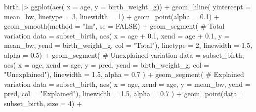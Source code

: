 \documentclass[
  letterpaper,
  DIV=11,
  numbers=noendperiod]{scrreprt}
\newenvironment{Shaded}{\begin{snugshade}}{\end{snugshade}}
\newcommand{\AttributeTok}[1]{\textcolor[rgb]{0.40,0.45,0.13}{#1}}
\newcommand{\CommentTok}[1]{\textcolor[rgb]{0.37,0.37,0.37}{#1}}
\newcommand{\ConstantTok}[1]{\textcolor[rgb]{0.56,0.35,0.01}{#1}}
\newcommand{\DecValTok}[1]{\textcolor[rgb]{0.68,0.00,0.00}{#1}}
\newcommand{\FloatTok}[1]{\textcolor[rgb]{0.68,0.00,0.00}{#1}}
\newcommand{\FunctionTok}[1]{\textcolor[rgb]{0.28,0.35,0.67}{#1}}
\newcommand{\NormalTok}[1]{\textcolor[rgb]{0.00,0.23,0.31}{#1}}
\newcommand{\SpecialCharTok}[1]{\textcolor[rgb]{0.37,0.37,0.37}{#1}}
\newcommand{\StringTok}[1]{\textcolor[rgb]{0.13,0.47,0.30}{#1}}
\begin{document}
\begin{Shaded}
\begin{Highlighting}[]
\NormalTok{birth }\SpecialCharTok{|\textgreater{}} 
  \FunctionTok{ggplot}\NormalTok{(}\FunctionTok{aes}\NormalTok{(}
    \AttributeTok{x =}\NormalTok{ age, }
    \AttributeTok{y =}\NormalTok{ birth\_weight\_g)) }\SpecialCharTok{+} 
  \FunctionTok{geom\_hline}\NormalTok{(}
    \AttributeTok{yintercept =}\NormalTok{ mean\_bw,}
    \AttributeTok{linetype =} \DecValTok{3}\NormalTok{,}
    \AttributeTok{linewidth =} \DecValTok{1}\NormalTok{) }\SpecialCharTok{+}
  \FunctionTok{geom\_point}\NormalTok{(}\AttributeTok{alpha =} \FloatTok{0.1}\NormalTok{) }\SpecialCharTok{+} 
  \FunctionTok{geom\_smooth}\NormalTok{(}\AttributeTok{method =} \StringTok{"lm"}\NormalTok{, }\AttributeTok{se =} \ConstantTok{FALSE}\NormalTok{) }\SpecialCharTok{+}
  \FunctionTok{geom\_segment}\NormalTok{( }\CommentTok{\# Total variation}
    \AttributeTok{data =}\NormalTok{ subset\_birth,}
    \FunctionTok{aes}\NormalTok{(}
      \AttributeTok{x =}\NormalTok{ age }\SpecialCharTok{+} \FloatTok{0.1}\NormalTok{,}
      \AttributeTok{xend =}\NormalTok{ age }\SpecialCharTok{+} \FloatTok{0.1}\NormalTok{,}
      \AttributeTok{y =}\NormalTok{  mean\_bw,}
      \AttributeTok{yend =}\NormalTok{ birth\_weight\_g,}
      \AttributeTok{col =} \StringTok{"Total"}\NormalTok{),}
    \AttributeTok{linetype =} \DecValTok{2}\NormalTok{,}
    \AttributeTok{linewidth =} \FloatTok{1.5}\NormalTok{,}
    \AttributeTok{alpha =} \FloatTok{0.5}\NormalTok{) }\SpecialCharTok{+}
    \FunctionTok{geom\_segment}\NormalTok{( }\CommentTok{\# Unexplained variation}
    \AttributeTok{data =}\NormalTok{ subset\_birth,}
    \FunctionTok{aes}\NormalTok{(}
      \AttributeTok{x =}\NormalTok{ age,}
      \AttributeTok{xend =}\NormalTok{ age,}
      \AttributeTok{y =}\NormalTok{  pred,}
      \AttributeTok{yend =}\NormalTok{ birth\_weight\_g,}
      \AttributeTok{col =} \StringTok{"Unexplained"}\NormalTok{),}
    \AttributeTok{linewidth =} \FloatTok{1.5}\NormalTok{,}
    \AttributeTok{alpha =} \FloatTok{0.7}
\NormalTok{    ) }\SpecialCharTok{+}
  \FunctionTok{geom\_segment}\NormalTok{( }\CommentTok{\# Explained variation}
    \AttributeTok{data =}\NormalTok{ subset\_birth,}
    \FunctionTok{aes}\NormalTok{(}
      \AttributeTok{x =}\NormalTok{ age,}
      \AttributeTok{xend =}\NormalTok{ age,}
      \AttributeTok{y =}\NormalTok{  mean\_bw,}
      \AttributeTok{yend =}\NormalTok{ pred,}
      \AttributeTok{col =} \StringTok{"Explained"}\NormalTok{),}
    \AttributeTok{linewidth =} \FloatTok{1.5}\NormalTok{,}
    \AttributeTok{alpha =} \FloatTok{0.7}
\NormalTok{    ) }\SpecialCharTok{+}
  \FunctionTok{geom\_point}\NormalTok{(}\AttributeTok{data =}\NormalTok{ subset\_birth, }\AttributeTok{size =} \DecValTok{4}\NormalTok{) }\SpecialCharTok{+} 

\end{Highlighting}
\end{Shaded}
\end{document}
